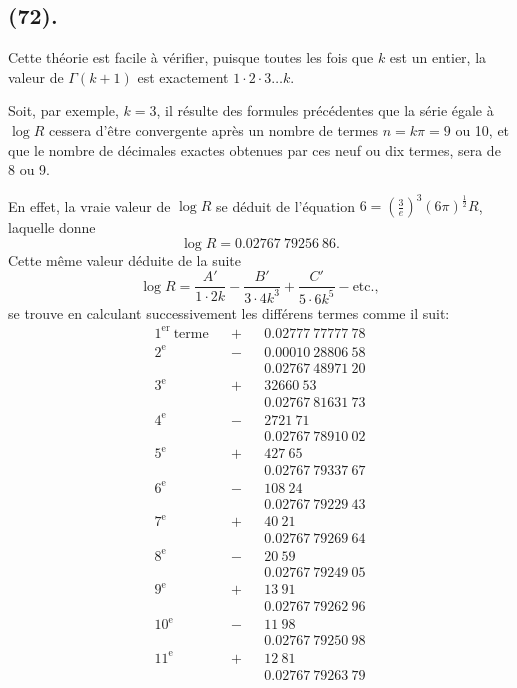 \documentclass{article}
\begin{document}
\subsection*{(72).}

Cette théorie est facile à vérifier, puisque toutes les fois que $k$ est un entier, la valeur de $\Gamma(k+1)$ est exactement $1\cdot2\cdot3\ldots k$.


Soit, par exemple, $k=3$, il résulte des formules précédentes que la série égale à $\log R$ cessera d'être convergente après un nombre de termes $n=k\pi=9$ ou 10, et que le nombre de décimales exactes obtenues par ces neuf ou dix termes, sera de 8 ou 9.

En effet, la vraie valeur de $\log R$ se déduit de l'équation $6=\left(\frac{3}{e}\right)^{3}(6\pi)^{\frac{1}{2}}R$, laquelle donne
\[ \log R=0.02767\ 79256\ 86. \]
Cette même valeur déduite de la suite
\[ \log R=\frac{A'}{1\cdot2k}-\frac{B'}{3\cdot4k^{3}}+\frac{C'}{5\cdot6k^{5}}-\text{etc.}, \]
se trouve en calculant successivement les différens termes comme il suit:
\[ \begin{aligned} 1^{\text{er}}\ \text{terme} && + && 0.02777\ 77777\ 78\\ 2^{\text{e}} && - && 0.00010\ 28806\ 58\\ && && 0.02767\ 48971\ 20\\ 3^{\text{e}} && + && 32660\ 53\\ && && 0.02767\ 81631\ 73\\ 4^{\text{e}} && - && 2721\ 71\\ && && 0.02767\ 78910\ 02\\ 5^{\text{e}} && + && 427\ 65\\ && && 0.02767\ 79337\ 67\\ 6^{\text{e}} && - && 108\ 24\\ && && 0.02767\ 79229\ 43\\ 7^{\text{e}} && + && 40\ 21\\ && && 0.02767\ 79269\ 64\\ 8^{\text{e}} && - && 20\ 59\\ && && 0.02767\ 79249\ 05\\ 9^{\text{e}} && + && 13\ 91\\ && && 0.02767\ 79262\ 96\\ 10^{\text{e}} && - && 11\ 98\\ && && 0.02767\ 79250\ 98\\ 11^{\text{e}} && + && 12\ 81\\ && && 0.02767\ 79263\ 79 \end{aligned} \]
\end{document}
